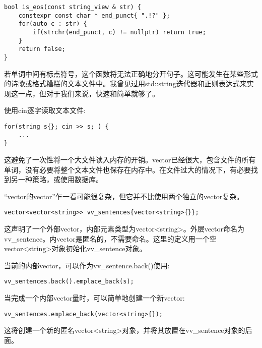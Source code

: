 \begin{lstlisting}[style=styleCXX]
bool is_eos(const string_view & str) {
	constexpr const char * end_punct{ ".!?" };
	for(auto c : str) {
		if(strchr(end_punct, c) != nullptr) return true;
	}
	return false;
}
\end{lstlisting}

若单词中间有标点符号，这个函数将无法正确地分开句子。这可能发生在某些形式的诗歌或格式糟糕的文本文件中。我曾见过用std::string迭代器和正则表达式来实现这一点，但对于我们来说，快速和简单就够了。

使用cin逐字读取文本文件:

\begin{lstlisting}[style=styleCXX]
for(string s{}; cin >> s; ) {
	...
}
\end{lstlisting}

这避免了一次性将一个大文件读入内存的开销。vector已经很大，包含文件的所有单词，没有必要将整个文本文件也保存在内存中。在文件过大的情况下，有必要找到另一种策略，或使用数据库。

“vector的vector”乍一看可能很复杂，但它并不比使用两个独立的vector复杂。

\begin{lstlisting}[style=styleCXX]
vector<vector<string>> vv_sentences{vector<string>{}};
\end{lstlisting}

这声明了一个外部vector，内部元素类型为vector<string>。外层vector命名为vv\_sentence。内vector是匿名的，不需要命名。这里的定义用一个空vector<string>对象初始化vv\_sentence对象。

当前的内部vector，可以作为vv\_sentence.back()使用:

\begin{lstlisting}[style=styleCXX]
vv_sentences.back().emplace_back(s);
\end{lstlisting}

当完成一个内部vector量时，可以简单地创建一个新vector:

\begin{lstlisting}[style=styleCXX]
vv_sentences.emplace_back(vector<string>{});
\end{lstlisting}

这将创建一个新的匿名vector<string>对象，并将其放置在vv\_sentence对象的后面。

